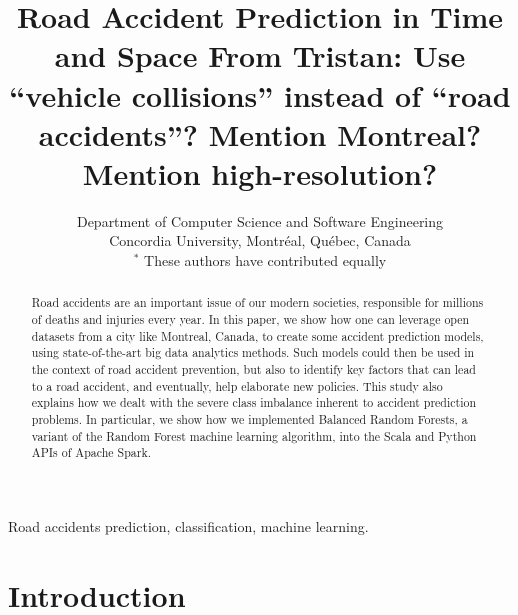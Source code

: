 \documentclass[conference]{IEEEtran}
\newcommand{\TG}[1]{\colorlet{saved}{.}\color{orange}From Tristan: #1\color{saved}}
\begin{document}
\title{Road Accident Prediction in Time and Space \TG{Use ``vehicle collisions'' instead of ``road accidents''? Mention Montreal? Mention
high-resolution?}}

\author{
Department of Computer Science and Software Engineering \\
Concordia University, Montréal, Québec, Canada\\
$^*$ These authors have contributed equally

}

\maketitle

\begin{abstract}
Road accidents are an important issue of our modern societies, responsible
for millions of deaths and injuries every year. In this paper, we show how one can
leverage open datasets from a city like Montreal, Canada, to create some
accident prediction models, using state-of-the-art big data analytics
methods. Such models could then be used in the context of road accident
prevention, but also to identify key factors that can lead to a road
accident, and eventually, help elaborate new policies. This study also
explains how we dealt with the severe class imbalance inherent to accident
prediction problems. In particular, we show
how we implemented Balanced Random Forests, a variant of the Random Forest
machine learning algorithm, into the Scala and Python APIs of Apache Spark.

\end{abstract}

\begin{IEEEkeywords}
Road accidents prediction, classification, machine learning.
\end{IEEEkeywords}

\section{Introduction}
\end{document}
